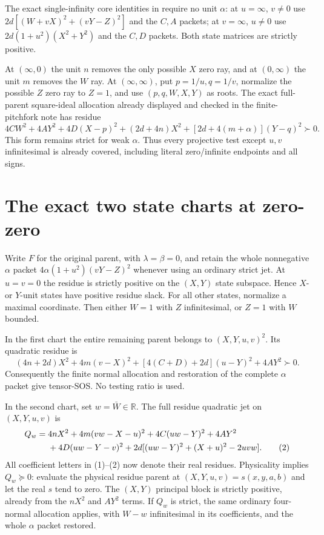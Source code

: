 The exact single-infinity core identities in
 require no unit $\alpha$: at
$u=\infty$, $v\ne0$ use
$2d[(W+vX)^2+(vY-Z)^2]$ and the $C,A$ packets; at $v=\infty$,
$u\ne0$ use $2d(1+u^2)(X^2+Y^2)$ and the $C,D$ packets.
Both state matrices are strictly positive.

At $(\infty,0)$ the unit $n$ removes the only possible $X$ zero
ray, and at $(0,\infty)$ the unit $m$ removes the $W$ ray.
At $(\infty,\infty)$, put $p=1/u,q=1/v$, normalize the possible
$Z$ zero ray to $Z=1$, and use $(p,q,W,X,Y)$ as roots. The exact
full-parent square-ideal allocation already displayed and checked in
the finite-pitchfork note has residue
\[
 4CW^2+4AY^2+4D(X-p)^2+(2d+4n)X^2
                         +[2d+4(m+\alpha)](Y-q)^2\succ0.
\]
This form remains strict for weak $\alpha$. Thus every projective
test except $u,v$ infinitesimal is already covered, including literal
zero/infinite endpoints and all signs.

\section{The exact two state charts at zero-zero}

Write $F$ for the original parent, with $\lambda=\beta=0$, and retain
the whole nonnegative $\alpha$ packet
$4\alpha(1+u^2)(vY-Z)^2$ whenever using an ordinary strict jet.
At $u=v=0$ the residue is strictly positive on the $(X,Y)$ state
subspace. Hence $X$- or $Y$-unit states have positive residue slack.
For all other states, normalize a maximal coordinate. Then either
$W=1$ with $Z$ infinitesimal, or $Z=1$ with $W$ bounded.

In the first chart the entire remaining parent belongs to
$(X,Y,u,v)^2$. Its quadratic residue is
\begin{equation}
 (4n+2d)X^2+4m(v-X)^2+[4(C+D)+2d](u-Y)^2+4AY^2\succ0. \tag{1}
\end{equation}
Consequently the finite normal allocation and restoration of the
complete $\alpha$ packet give tensor-SOS. No testing ratio is used.

In the second chart, set $w=\bar W\in\mathbb R$. The full residue
quadratic jet on $(X,Y,u,v)$ is
\begin{align}
 Q_w={}&4nX^2+4m(vw-X-u)^2+4C(uw-Y)^2+4AY^2\notag\\
      &+4D(uw-Y-v)^2
        +2d[(uw-Y)^2+(X+u)^2-2uvw].                    \tag{2}
\end{align}
All coefficient letters in (1)--(2) now denote their real residues.
Physicality implies $Q_w\succeq0$: evaluate the physical residue
parent at $(X,Y,u,v)=s(x,y,a,b)$ and let the real $s$ tend to zero.
The $(X,Y)$ principal block is strictly positive, already from the
$nX^2$ and $AY^2$ terms. If $Q_w$ is strict, the same ordinary
four-normal allocation applies, with $W-w$ infinitesimal in its
coefficients, and the whole $\alpha$ packet restored.

